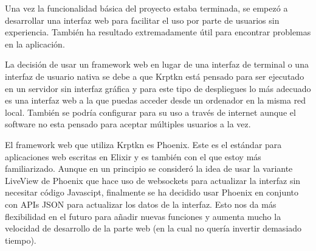 Una vez la funcionalidad básica del proyecto estaba terminada, se empezó a desarrollar una interfaz web para facilitar el uso por parte de usuarios sin experiencia. También ha resultado extremadamente útil para encontrar problemas en la aplicación.

La decisión de usar un framework web en lugar de una interfaz de terminal o una interfaz de usuario nativa se debe a que Krptkn está pensado para ser ejecutado en un servidor sin interfaz gráfica y para este tipo de despliegues lo más adecuado es una interfaz web a la que puedas acceder desde un ordenador en la misma red local. También se podría configurar para su uso a través de internet aunque el software no esta pensado para aceptar múltiples usuarios a la vez.

El framework web que utiliza Krptkn es Phoenix. Este es el estándar para aplicaciones web escritas en Elixir y es también con el que estoy más familiarizado. Aunque en un principio se consideró la idea de usar la variante LiveView de Phoenix que hace uso de websockets para actualizar la interfaz sin necesitar código Javascipt, finalmente se ha decidido usar Phoenix en conjunto con APIs JSON para actualizar los datos de la interfaz. Esto nos da más flexibilidad en el futuro para añadir nuevas funciones y aumenta mucho la velocidad de desarrollo de la parte web (en la cual no quería invertir demasiado tiempo).